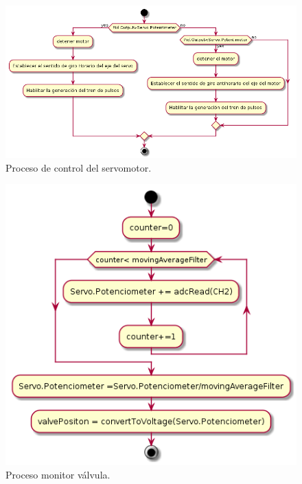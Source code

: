 \begin{figure}[htpb]
	\centering
	\includegraphics[scale=.60]{./Figures/ProcesoControlServo.png}
	\caption{Proceso de control del servomotor.}
	\label{fig:Control servomotor}
	\end{figure}

 	\begin{figure}[htpb]
	\centering
	\includegraphics[scale=.60]{./Figures/MonitorValvula.png}
	\caption{Proceso monitor válvula.}
	\label{fig:Proceso monitor valvula}
	\end{figure}

